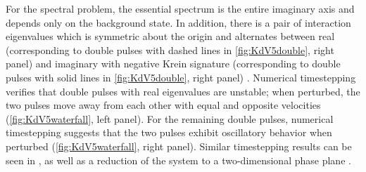\documentclass[10pt,reqno]{amsart}
\theoremstyle{plain}
\theoremstyle{definition}
\theoremstyle{remark}
\numberwithin{theorem}{section}
\numberwithin{equation}{section}
\begin{document}
\noi For the spectral problem, the essential spectrum is the entire imaginary axis and depends only on the background state. 
\noi In addition, there is a pair of interaction eigenvalues which is symmetric about the origin and alternates between real (corresponding to double pulses with dashed lines in \cref{fig:KdV5double}, right panel) and imaginary with negative Krein signature (corresponding to double pulses with solid lines in \cref{fig:KdV5double}, right panel) \cite{Pelinovsky2007}. Numerical timestepping verifies that double pulses with real eigenvalues are unstable; when perturbed, the two pulses move away from each other with equal and opposite velocities (\cref{fig:KdV5waterfall}, left panel). For the remaining double pulses, numerical timestepping suggests that the two pulses exhibit oscillatory behavior when perturbed (\cref{fig:KdV5waterfall}, right panel). Similar timestepping results can be seen in \cite[Figure 9]{Pelinovsky2007}, as well as a reduction of the system to a two-dimensional phase plane \cite[Figure 10]{Pelinovsky2007}.
\end{document}
